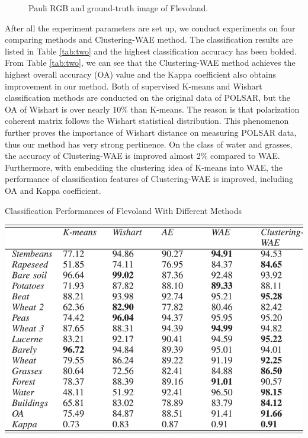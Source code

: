 \documentclass[11pt, a4paper, onecolumn, oneside]{article}
\begin{document}
\begin{figure}
\caption{Pauli RGB and ground-truth image of Flevoland.}
\label{fig:four}
\end{figure}

After all the experiment parameters are set up, we conduct experiments on four comparing methods and Clustering-WAE method. The classification results are listed in Table \ref{tab:two} and the highest classification accuracy has been bolded. From Table \ref{tab:two}, we can see that the Clustering-WAE method achieves the highest overall accuracy (OA) value and the Kappa coefficient also obtains improvement in our method. Both of supervised K-means and Wishart classification methods are conducted on the original data of POLSAR, but the OA of Wishart is over nearly 10\% than K-means. The reason is that polarization coherent matrix follows the Wishart statistical distribution. This phenomenon further proves the importance of Wishart distance on measuring POLSAR data, thus our method has very strong pertinence. On the class of water and grasses, the accuracy of Clustering-WAE is improved almost 2\% compared to WAE. Furthermore, with embedding the clustering idea of K-means into WAE, the performance of classification features of Clustering-WAE is improved, including OA and Kappa coefficient.

\begin{table}
  \caption{Classification Performances of Flevoland With Different Methods}
  \label{tab:two}
  \includegraphics[width=\linewidth]{table_2.jpg}
\end{table}
\end{document}
